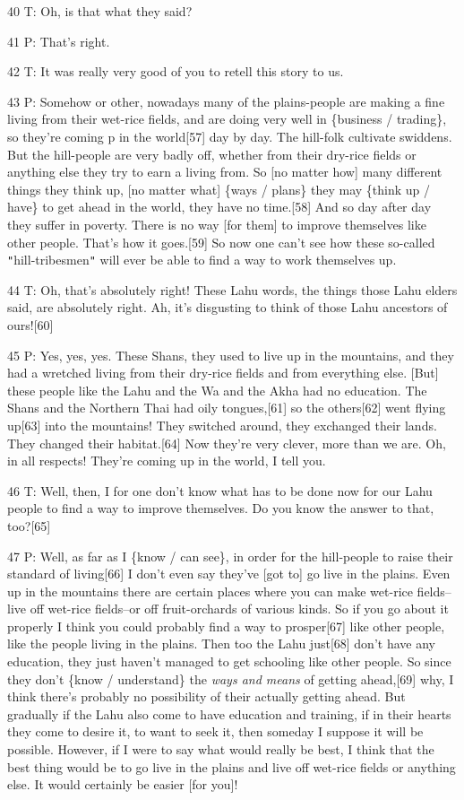 {40 T: Oh, is that what they said?}

{41 P: That's right.}

{42 T: It was really very good of you to retell this story to us.}

{43 P: Somehow or other, nowadays many of the plains-people are making a
fine living from their wet-rice fields, and are doing very well in \{business /
trading\}, so they're coming p in the world[57] day by day. The hill-folk cultivate
swiddens. But the hill-people are very badly off, whether from their dry-rice fields
or anything else they try to earn a living from. So [no matter how] many different
things they think up, [no matter what] \{ways / plans\} they may \{think up / have\}
to get ahead in the world, they have no time.[58] And so day after day they suffer
in poverty. There is no way [for them] to improve themselves like other people.
That's how it goes.[59] So now one can't see how these so-called \texttt{"}hill-tribesmen\texttt{"}
will ever be able to find a way to work themselves up. }

{44 T: Oh, that's absolutely right! These Lahu words, the things those Lahu
elders said, are absolutely right. Ah, it's disgusting to think of those Lahu ancestors
of ours![60]}

{45 P: Yes, yes, yes. These Shans, they used to live up in the mountains,
and they had a wretched living from their dry-rice fields and from everything else.
[But] these people like the Lahu and the Wa and the Akha had no education. The
Shans and the Northern Thai had oily tongues,[61] so the others[62] went flying
up[63] into the mountains! They switched around, they exchanged their lands. They
changed their habitat.[64] Now they're very clever, more than we are. Oh, in all
respects! They're coming up in the world, I tell you.}

{46 T: Well, then, I for one don't know what has to be done now for our
Lahu people to find a way to improve themselves. Do you know the answer to that,
too?[65]}

{47 P: Well, as far as I \{know / can see\}, in order for the hill-people
to raise their standard of living[66] I don't even say they've [got to] go live
in the plains. Even up in the mountains there are certain places where you can
make wet-rice fields--live off wet-rice fields--or off fruit-orchards of various
kinds. So if you go about it properly I think you could probably find a way to
prosper[67] like other people, like the people living in the plains. Then too the
Lahu just[68] don't have any education, they just haven't managed to get schooling
like other people. So since they don't \{know / understand\} the }{\textit{ways
and means}}{ of getting ahead,[69] why, I think there's probably no possibility
of their actually getting ahead. But gradually if the Lahu also come to have education
and training, if in their hearts they come to desire it, to want to seek it, then
someday I suppose it will be possible. However, if I were to say what would really
be best, I think that the best thing would be to go live in the plains and live
off wet-rice fields or anything else. It would certainly be easier [for you]! }

